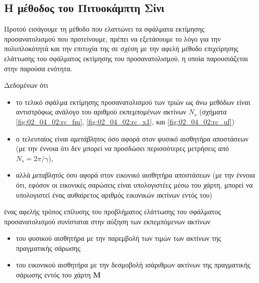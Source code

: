 \subsection{Η μέθοδος του Πιτυοκάμπτη Σίνι}
\label{subsection:02_04_02:05}

Προτού εισάγουμε τη μέθοδο που ελαττώνει τα σφάλματα εκτίμησης προσανατολισμού
που προτείνουμε, πρέπει να εξετάσουμε το λόγο για την πολυπλοκότητά και την
επιτυχία της σε σχέση με την αφελή μέθοδο επιχείρησης ελάττωσης του σφάλματος
εκτίμησης του προσανατολισμού, η οποία παρουσιάζεται στην παρούσα ενότητα.

Δεδομένων ότι

\begin{itemize}
  \item το τελικό σφάλμα εκτίμησης προσανατολισμού των τριών ως άνω μεθόδων
        είναι αντιστρόφως ανάλογο του αριθμού εκπεμπομένων ακτίνων $N_s$
        (σχήματα \ref{fig:02_04_02:rc_fm}, \ref{fig:02_04_02:rc_x1}, και
        \ref{fig:02_04_02:rc_uf})
  \item ο τελευταίος είναι \textit{αμετάβλητος} όσο αφορά στον φυσικό αισθητήρα
        αποστάσεων (με την έννοια ότι δεν μπορεί να προσδώσει περισσότερες
        μετρήσεις από $N_s = 2\pi/\gamma$),
  \item αλλά \textit{μεταβλητός} όσο αφορά στον εικονικό αισθητήρα
        αποστάσεων (με την έννοια ότι, εφόσον οι εικονικές σαρώσεις είναι
        υπολογιστέες μέσω του χάρτη, μπορεί να υπολογιστεί ένας αυθαίρετος
        αριθμός εικονικών ακτίνων εντός του)
\end{itemize}
ένας αφελής τρόπος επίλυσης του προβλήματος ελάττωσης του σφάλματος
προσανατολισμού συνίσταται στην αύξηση των εκπεμπόμενων ακτίνων
\begin{itemize}
  \item του φυσικού αισθητήρα με την παρεμβολή των τιμών των ακτίνων της
        πραγματικής σάρωσης
  \item του εικονικού αισθητήρα με την δεσμοβολή ισάριθμων ακτίνων της
        πραγματικής σάρωσης εντός του χάρτη $\bm{M}$
\end{itemize}

